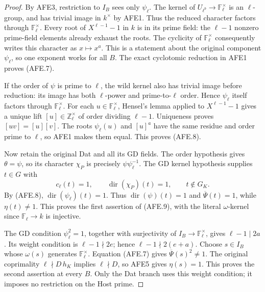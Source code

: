 \begin{proof}
By AFE3, restriction to \(I_B\) sees only \(\psi_\ell\).
The kernel of \(U_{\ell^b}\to\mathbb F_\ell^\times\)
is an \(\ell\)-group, and has trivial image in \(k^\times\)
by AFE1.  Thus the reduced character factors through
\(\mathbb F_\ell^\times\).  Every root of
\(X^{\ell-1}-1\) in \(k\) is in its prime field:
the \(\ell-1\) nonzero prime-field elements already
exhaust the roots.  The cyclicity of
\(\mathbb F_\ell^\times\) consequently writes this
character as \(x\mapsto x^a\).
This is a statement about the original component
\(\psi_\ell\), so one exponent works for all \(B\).
The exact cyclotomic reduction in AFE1 proves (AFE.7).

If the order of \(\psi\) is prime to \(\ell\), the wild
kernel also has trivial image before reduction:
its image has both \(\ell\)-power and prime-to-\(\ell\)
order.  Hence \(\psi_\ell\) itself factors through
\(\mathbb F_\ell^\times\).
For each \(u\in\mathbb F_\ell^\times\), Hensel's lemma
applied to \(X^{\ell-1}-1\) gives a unique lift
\([u]\in\mathbb Z_\ell^\times\) of order dividing
\(\ell-1\).  Uniqueness proves \([uv]=[u][v]\).
The roots \(\psi_\ell(u)\) and \([u]^a\) have the same
residue and order prime to \(\ell\), so AFE1 makes
them equal.  This proves (AFE.8).

Now retain the original Dat and all its GD fields.
The order hypothesis gives \(\theta=\psi\), so its
character \(\chi_P\) is precisely
\(\psi\psi_\ell^{-1}\).
The GD kernel hypothesis supplies \(t\in G\) with
\[
      c_\ell(t)=1,\qquad
      \operatorname{dir}(\chi_P)(t)=1,\qquad
      t\notin G_K.
 \]
By (AFE.8), \(\operatorname{dir}(\psi_\ell)(t)=1\).
Thus \(\operatorname{dir}(\psi)(t)=1\) and
\(\overline\Psi(t)=1\), while
\(\eta(t)\ne1\).  This proves the first assertion
of (AFE.9), with the literal \(\omega\)-kernel since
\(\mathbb F_\ell\to k\) is injective.

The GD condition \(\psi_\ell^2=1\), together with
surjectivity of \(I_B\to\mathbb F_\ell^\times\), gives
\(\ell-1\mid2a\).
Its weight condition is \(\ell-1\nmid2e\); hence
\(\ell-1\nmid2(e+a)\).
Choose \(s\in I_B\) whose \(\omega(s)\) generates
\(\mathbb F_\ell^\times\).  Equation (AFE.7) gives
\(\overline\Psi(s)^2\ne1\).
The original coprimality
\(\ell\nmid D\,h_K\) implies \(\ell\nmid D\),
so AFE5 gives \(\eta(s)=1\).
This proves the second assertion at every \(B\).
Only the Dat branch uses this weight condition;
it imposes no restriction on the Host prime.
\end{proof}

